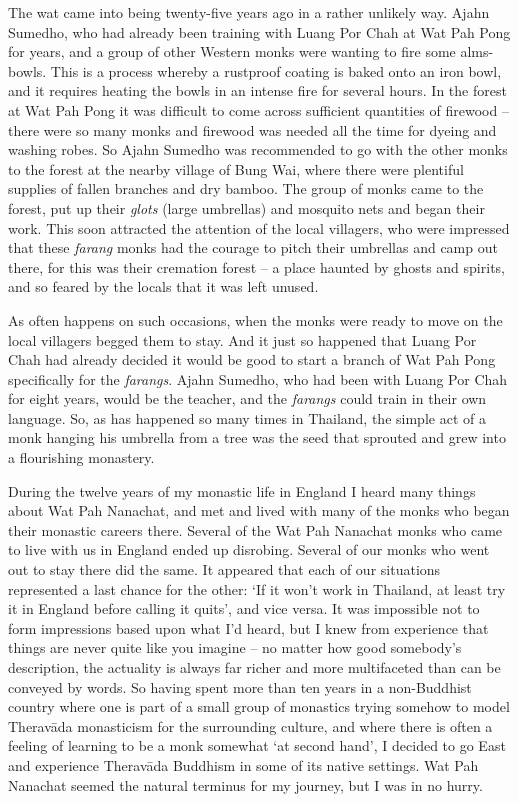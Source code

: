 The wat came into being twenty-five years ago in a rather unlikely way. 
Ajahn Sumedho, who had already been training with Luang Por Chah at Wat
Pah Pong for years, and a group of other Western monks were wanting to
fire some alms-bowls. This is a process whereby a rustproof coating is
baked onto an iron bowl, and it requires heating the bowls in an intense
fire for several hours. In the forest at Wat Pah Pong it was difficult
to come across sufficient quantities of firewood -- there were so many
monks and firewood was needed all the time for dyeing and washing robes. 
So Ajahn Sumedho was recommended to go with the other monks to the
forest at the nearby village of Bung Wai, where there were plentiful
supplies of fallen branches and dry bamboo. The group of monks came to
the forest, put up their \emph{glots} (large umbrellas) and mosquito
nets and began their work. This soon attracted the attention of the
local villagers, who were impressed that these \emph{farang} monks had
the courage to pitch their umbrellas and camp out there, for this was
their cremation forest -- a place haunted by ghosts and spirits, and so
feared by the locals that it was left unused. 

As often happens on such occasions, when the monks were ready to move on
the local villagers begged them to stay. And it just so happened that
Luang Por Chah had already decided it would be good to start a branch of
Wat Pah Pong specifically for the \emph{farangs}. Ajahn Sumedho, who had
been with Luang Por Chah for eight years, would be the teacher, and the
\emph{farangs} could train in their own language. So, as has happened so
many times in Thailand, the simple act of a monk hanging his umbrella
from a tree was the seed that sprouted and grew into a flourishing
monastery. 

During the twelve years of my monastic life in England I heard many
things about Wat Pah Nanachat, and met and lived with many of the monks
who began their monastic careers there. Several of the Wat Pah Nanachat
monks who came to live with us in England ended up disrobing. Several of
our monks who went out to stay there did the same. It appeared that each
of our situations represented a last chance for the other: `If it won't
work in Thailand, at least try it in England before calling it quits', 
and vice versa. It was impossible not to form impressions based upon
what I'd heard, but I knew from experience that things are never quite
like you imagine -- no matter how good somebody's description, the
actuality is always far richer and more multifaceted than can be
conveyed by words. So having spent more than ten years in a non-Buddhist
country where one is part of a small group of monastics trying somehow
to model Theravāda monasticism for the surrounding culture, and where
there is often a feeling of learning to be a monk somewhat `at second
hand', I decided to go East and experience Theravāda Buddhism in some of
its native settings. Wat Pah Nanachat seemed the natural terminus for my
journey, but I was in no hurry. 

